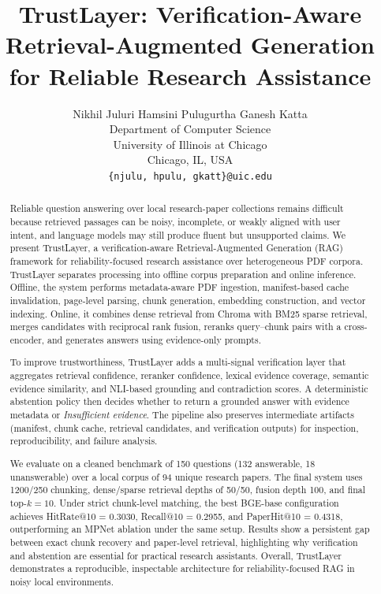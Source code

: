 \documentclass[11pt]{article}
\title{TrustLayer: Verification-Aware Retrieval-Augmented Generation for Reliable Research Assistance}
\author{
  Nikhil Juluri \quad
  Hamsini Pulugurtha \quad
  Ganesh Katta \\
  Department of Computer Science \\
  University of Illinois at Chicago \\
  Chicago, IL, USA \\
  \texttt{\{njulu, hpulu, gkatt\}@uic.edu}
}
\begin{document}
\maketitle
\begin{abstract}
Reliable question answering over local research-paper collections remains difficult because retrieved passages can be noisy, incomplete, or weakly aligned with user intent, and language models may still produce fluent but unsupported claims. We present TrustLayer, a verification-aware Retrieval-Augmented Generation (RAG) framework for reliability-focused research assistance over heterogeneous PDF corpora. TrustLayer separates processing into offline corpus preparation and online inference. Offline, the system performs metadata-aware PDF ingestion, manifest-based cache invalidation, page-level parsing, chunk generation, embedding construction, and vector indexing. Online, it combines dense retrieval from Chroma with BM25 sparse retrieval, merges candidates with reciprocal rank fusion, reranks query--chunk pairs with a cross-encoder, and generates answers using evidence-only prompts.

To improve trustworthiness, TrustLayer adds a multi-signal verification layer that aggregates retrieval confidence, reranker confidence, lexical evidence coverage, semantic evidence similarity, and NLI-based grounding and contradiction scores. A deterministic abstention policy then decides whether to return a grounded answer with evidence metadata or \emph{Insufficient evidence}. The pipeline also preserves intermediate artifacts (manifest, chunk cache, retrieval candidates, and verification outputs) for inspection, reproducibility, and failure analysis.

We evaluate on a cleaned benchmark of 150 questions (132 answerable, 18 unanswerable) over a local corpus of 94 unique research papers. The final system uses 1200/250 chunking, dense/sparse retrieval depths of 50/50, fusion depth 100, and final top-$k=10$. Under strict chunk-level matching, the best BGE-base configuration achieves HitRate@10 = 0.3030, Recall@10 = 0.2955, and PaperHit@10 = 0.4318, outperforming an MPNet ablation under the same setup. Results show a persistent gap between exact chunk recovery and paper-level retrieval, highlighting why verification and abstention are essential for practical research assistants. Overall, TrustLayer demonstrates a reproducible, inspectable architecture for reliability-focused RAG in noisy local environments.
\end{abstract}
\end{document}
